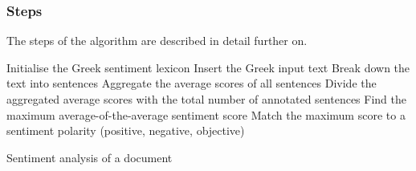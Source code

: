 \clearpage

\subsubsection{Steps}
\label{subsubsec:steps}

The steps of the algorithm are described in detail further on.

\hfill

\begin{algorithm}[H]
\SetAlgoLined
{}
 Initialise the Greek sentiment lexicon\;
 Insert the Greek input text\;
 Break down the text into sentences\;
 Aggregate the average scores of all sentences\;
 Divide the aggregated average scores with the total number of annotated sentences\;
 Find the maximum average-of-the-average sentiment score\;
 Match the maximum score to a sentiment polarity (positive, negative, objective)\;
 \caption{Sentiment analysis of a document}
\end{algorithm}

